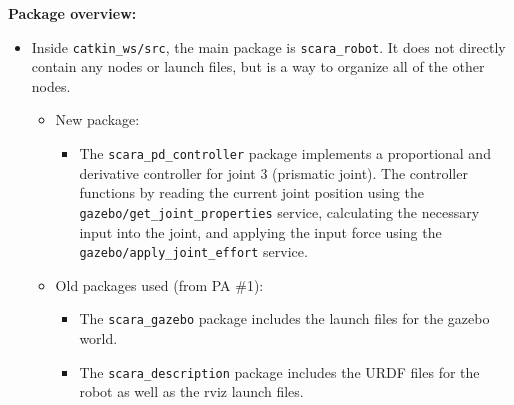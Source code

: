\documentclass[10pt]{article}
\begin{document}
\setlength{\abovedisplayskip}{6pt}
\setlength{\belowdisplayskip}{3pt}
\setlength{\abovedisplayshortskip}{4pt}
\setlength{\belowdisplayshortskip}{4pt}

\textbf{Package overview:}
\begin{itemize}
	\item Inside \texttt{catkin\_ws/src}, the main package is \texttt{scara\_robot}. It does not directly contain any nodes or launch files, but is a way to organize all of the other nodes.
	\begin{itemize}
		\item New package:
		\begin{itemize}
			\item The \texttt{scara\_pd\_controller} package implements a proportional and derivative controller for joint 3 (prismatic joint). The controller functions by reading the current joint position using the \\ \texttt{gazebo/get\_joint\_properties} service, calculating the necessary input into the joint, and applying the input force using the \texttt{gazebo/apply\_joint\_effort} service.
		\end{itemize}
		
		\item Old packages used (from PA \#1):
		\begin{itemize}
			\item The \texttt{scara\_gazebo} package includes the launch files for the gazebo world.
			\item The \texttt{scara\_description} package includes the URDF files for the robot as well as the rviz launch files.
		\end{itemize}
	\end{itemize}
\end{itemize}
\end{document}
